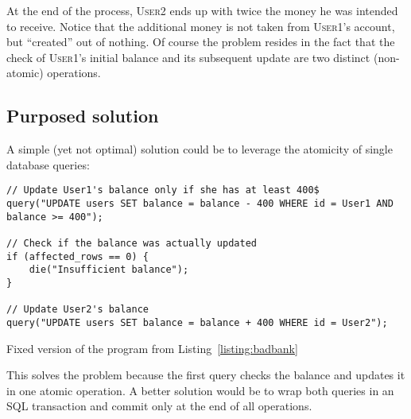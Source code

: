 At the end of the process, \textsc{User2} ends up with twice the money he was intended to receive. Notice that the additional money is not taken from \textsc{User1}'s account, but ``created'' out of nothing. Of course the problem resides in the fact that the check of \textsc{User1}'s initial balance and its subsequent update are two distinct (non-atomic) operations.

\subsection{Purposed solution}

A simple (yet not optimal) solution could be to leverage the atomicity of single database queries:

\begin{listing}[H]
\begin{verbatim}
// Update User1's balance only if she has at least 400$
query("UPDATE users SET balance = balance - 400 WHERE id = User1 AND balance >= 400");

// Check if the balance was actually updated
if (affected_rows == 0) {
    die("Insufficient balance");
}

// Update User2's balance
query("UPDATE users SET balance = balance + 400 WHERE id = User2");
\end{verbatim}
\caption{Fixed version of the program from Listing~\ref{listing:badbank}}
\label{listing:fix}
\end{listing}

This solves the problem because the first query checks the balance and updates it in one atomic operation. A better solution would be to wrap both queries in an SQL transaction and commit only at the end of all operations.

